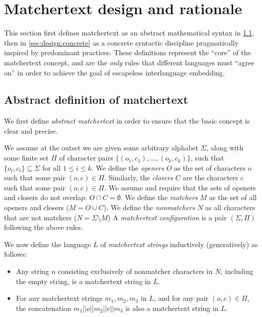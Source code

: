 \section{Matchertext design and rationale}
\label{sec:design}

This section first defines matchertext 
as an abstract mathematical syntax in \cref{sec:design:abstract},
then in \cref{sec:design:concrete}
as a concrete syntactic discipline
pragmatically inspired by predominant practices.
These definitions represent the ``core'' of the matchertext concept,
and are the \emph{only} rules
that different languages must ``agree on''
in order to achieve the goal of escapeless interlanguage embedding.

\subsection{Abstract definition of matchertext}
\label{sec:design:abstract}

We first define \emph{abstract matchertext}
in order to ensure that the basic concept is clear and precise.

We assume at the outset we are given some arbitrary alphabet $\Sigma$,
along with some finite set $\Pi$ of character pairs 
$\{(o_1,c_1),\dots,(o_k,c_k)\}$,
such that $\{o_i, c_i\} \subseteq \Sigma$ for all $1 \le i \le k$.
We define the \emph{openers} $O$ as the set of characters $o$
such that some pair $(o, c) \in \Pi$.
Similarly, the \emph{closers} $C$ are the characters $c$
such that some pair $(o, c) \in \Pi$.
We assume and require that the sets of openers and closers do not overlap:
\ie $O \cap C = \emptyset$.
We define the \emph{matchers} $M$ as the set of all openers and closers
(\ie $M = O \cup C$).
We define the \emph{nonmatchers} $N$ as
all characters that are not matchers
(\ie $N = \Sigma \setminus M$)
A \emph{matchertext configuration}
is a pair $(\Sigma, \Pi)$ following the above rules.

We now define the language $L$ of \emph{matchertext strings}
inductively (\ie generatively) as follows:
\begin{itemize}
\item	Any string $n$ consisting exclusively of nonmatcher characters in $N$,
	including the empty string,
	is a matchertext string in $L$.
\item	For any matchertext strings $m_1,m_2,m_3$ in $L$,
	and for any pair $(o,c) \in \Pi$,
	the concatenation $m_1||o||m_2||c||m_3$
	is also a matchertext string in $L$.
\end{itemize}


